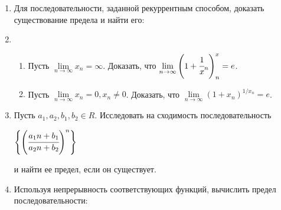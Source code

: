 \documentclass[a4paper]{article}
\begin{document}
\begin{enumerate} [label=\textbf{\arabic*.}]
\begin{enumerate}
			\begin{center}
				$0<\pi/2+\pi n-x_n<\cfrac{2/a}{\pi/2+\pi n+\sqrt{(\pi/2+\pi n)^2}-4a}$.
			\end{center}
		\item
			Найти $\lim\limits_{n \to \infty} {x_{n+1}-x_n}$, где последовательность $\left\{x_n\right\}$ определена в \ref{1}) и \ref{2}).
	\end{enumerate}
\item 	
	Для последовательности, заданной рекуррентным способом, доказать существование предела и найти его:
\\	
\item 	
	\begin{enumerate}
		\item 
			Пусть $\lim\limits_{n \to \infty} {x_n}=\infty$. Доказать, что $\lim\limits_{n \to \infty} {\left(1+\cfrac1x_n\right)^x_n}=e$.
		\item 
			Пусть $\lim\limits_{n \to \infty} {x_n}=0, x_n \not=0$. Доказать, что $\lim\limits_{n \to \infty} {\left(1+x_n\right)^{1/x_n}}=e$.
	\end{enumerate}
\item
	Пусть $a_1,a_2,b_1,b_2 \in R$. Исследовать на сходимость последовательность
	\begin{center}
		$\left\{\left(\cfrac{a_1n+b_1}{a_2n+b_2}\right)^n\right\}$
	\end{center}
	и найти ее предел, если он существует.
 \item
	Используя непрерывность соответствующих функций, вычислить предел последовательности:
\\	
\end{enumerate}
\end{document}
